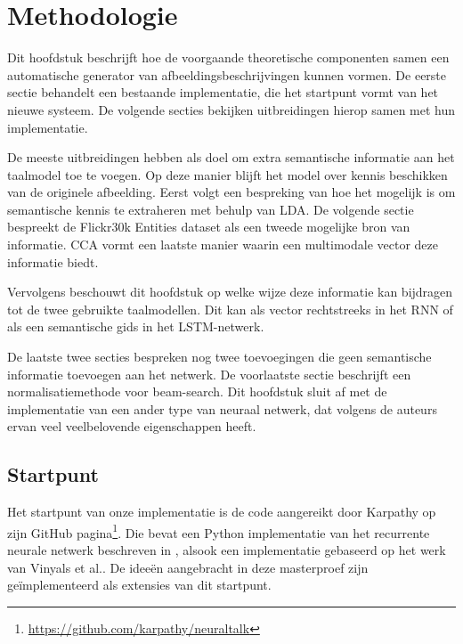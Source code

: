 \chapter{Methodologie}

Dit hoofdstuk beschrijft hoe de voorgaande theoretische componenten samen een automatische generator van afbeeldingsbeschrijvingen kunnen vormen. De eerste sectie behandelt een bestaande implementatie, die het startpunt vormt van het nieuwe systeem. De volgende secties bekijken uitbreidingen hierop samen met hun implementatie. 

De meeste uitbreidingen hebben als doel om extra semantische informatie aan het taalmodel toe te voegen. Op deze manier blijft het model over kennis beschikken van de originele afbeelding. Eerst volgt een bespreking van hoe het mogelijk is om semantische kennis te extraheren met behulp van LDA. De volgende sectie bespreekt de Flickr30k Entities dataset als een tweede mogelijke bron van informatie. CCA vormt een laatste manier waarin een multimodale vector deze informatie biedt.

Vervolgens beschouwt dit hoofdstuk op welke wijze deze informatie kan bijdragen tot de twee gebruikte taalmodellen. Dit kan als vector rechtstreeks in het RNN of als een semantische gids in het LSTM-netwerk. 

De laatste twee secties bespreken nog twee toevoegingen die geen semantische informatie toevoegen aan het netwerk. De voorlaatste sectie beschrijft een normalisatiemethode voor beam-search. Dit hoofdstuk sluit af met de implementatie van een ander type van neuraal netwerk, dat volgens de auteurs ervan veel veelbelovende eigenschappen heeft.


\section{Startpunt}
Het startpunt van onze implementatie is de code aangereikt door Karpathy op zijn GitHub pagina\footnote{\url{https://github.com/karpathy/neuraltalk}}. Die bevat een Python implementatie van het recurrente neurale netwerk beschreven in \cite{Karpathy2015}, alsook een implementatie gebaseerd op het werk van Vinyals et al.\cite{Google}. De idee\"en aangebracht in deze masterproef zijn ge\"implementeerd als extensies van dit startpunt.

